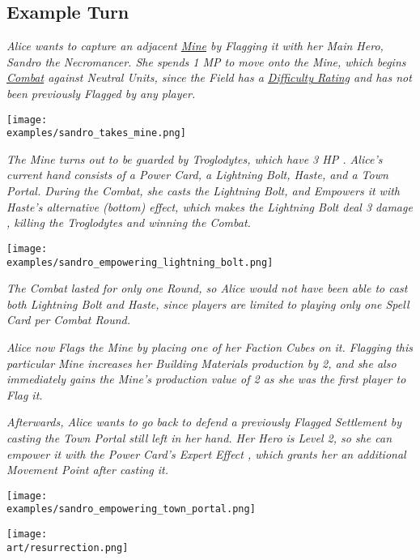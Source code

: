 \clearpage

\subsection*{Example Turn}

\begin{multicols*}{2}

\textit{Alice wants to capture an adjacent \hyperlink{Mines}{Mine} by Flagging it with her Main Hero, Sandro the Necromancer.
    She spends 1 MP to move onto the Mine, which begins \hyperlink{Combat}{Combat} against Neutral Units, since the Field has a \hyperlink{Difficulty}{Difficulty Rating} and has not been previously Flagged by any player.}\par

\texttt{[image: \\examples/sandro\_takes\_mine.png]}

\textit{The Mine turns out to be guarded by Troglodytes, which have 3 HP .
Alice's current hand consists of a Power Card, a Lightning Bolt, Haste, and a Town Portal.
During the Combat, she casts the Lightning Bolt, and Empowers  it with Haste's alternative (bottom) effect, which makes the Lightning Bolt deal 3 damage , killing the Troglodytes and winning the Combat.}

\texttt{[image: \\examples/sandro\_empowering\_lightning\_bolt.png]}

\textit{The Combat lasted for only one Round, so Alice would not have been able to cast both Lightning Bolt and Haste, since players are limited to playing only one Spell Card per Combat Round.}\par


\textit{Alice now Flags the Mine by placing one of her Faction Cubes on it.
    Flagging this particular Mine increases her Building Materials  production by 2, and she also immediately gains the Mine's production value of 2  as she was the first player to Flag it.}\par
\textit{Afterwards, Alice wants to go back to defend a previously Flagged Settlement by casting the Town Portal still left in her hand.
    Her Hero is Level 2, so she can empower it with the Power Card's Expert Effect , which grants her an additional Movement Point after casting it.
}

\texttt{[image: \\examples/sandro\_empowering\_town\_portal.png]}

\vfill
\hspace{2em}
\texttt{[image: \\art/resurrection.png]}
\end{multicols*}
